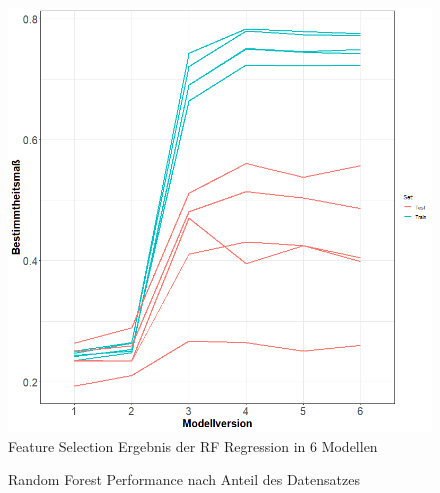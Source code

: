 \documentclass[a4paper,12pt]{thesis}
\begin{document}
\begin{figure}[!ht]
	\centering
	\includegraphics[width=\textwidth]{Plots/plot40.png}
	\caption{Feature Selection Ergebnis der RF Regression in 6 Modellen}
	\label{RF_ModelSelection}
\end{figure}

\begin{figure}%
	\centering
	\qquad
	\caption{Random Forest Performance nach Anteil des Datensatzes}%
	\label{fig:TrainingsShareValidation1}%
\end{figure}
\end{document}
